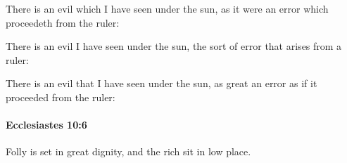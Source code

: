 			\begin{versebox}
					\item[BHS] 
					\item[LXX] 
					\item[ASV] There is an evil which I have seen under the sun, as it were an error which proceedeth from the ruler:
					\item[NIV] There is an evil I have seen under the sun, the sort of error that arises from a ruler:
					\item[NRSV] There is an evil that I have seen under the sun, as great an error as if it proceeded from the ruler:
			\end{versebox}

		\paragraph{Ecclesiastes 10:6} %
			\label{ECCLESIASTES-10-6}

			Folly is set in great dignity, and the rich sit in low place.

